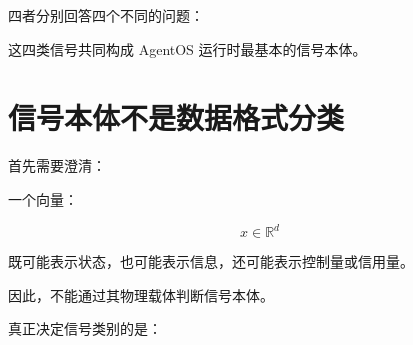 \begin{statementbox}
\centering
{}
\end{statementbox}

四者分别回答四个不同的问题：

\begin{statementbox}
\centering
{}
\end{statementbox}

\begin{statementbox}
\centering
{}
\end{statementbox}

\begin{statementbox}
\centering
{}
\end{statementbox}

\begin{statementbox}
\centering
{}
\end{statementbox}

这四类信号共同构成 AgentOS 运行时最基本的信号本体。

\section{信号本体不是数据格式分类}

首先需要澄清：

\begin{statementbox}
\centering
{}
\end{statementbox}

一个向量：

\[
x\in\mathbb R^d
\]

既可能表示状态，也可能表示信息，还可能表示控制量或信用量。

因此，不能通过其物理载体判断信号本体。

真正决定信号类别的是：

\begin{statementbox}
\centering
{}
\end{statementbox}

